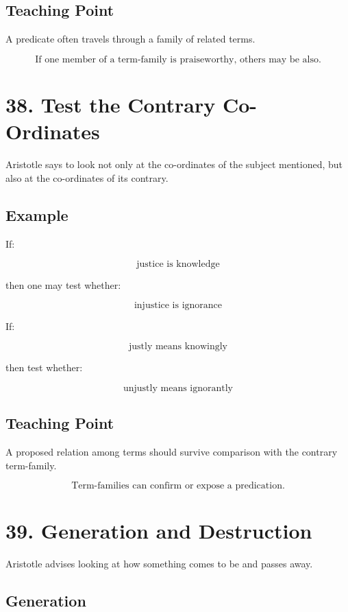 \documentclass[12pt]{article}
\begin{document}
\subsection*{Teaching Point}

A predicate often travels through a family of related terms.

\[
\boxed{
\text{If one member of a term-family is praiseworthy, others may be also.}
}
\]

\section*{38. Test the Contrary Co-Ordinates}

Aristotle says to look not only at the co-ordinates of the subject mentioned,
but also at the co-ordinates of its contrary.

\subsection*{Example}

If:

\[
\text{justice is knowledge}
\]

then one may test whether:

\[
\text{injustice is ignorance}
\]

If:

\[
\text{justly means knowingly}
\]

then test whether:

\[
\text{unjustly means ignorantly}
\]

\subsection*{Teaching Point}

A proposed relation among terms should survive comparison with the contrary
term-family.

\[
\boxed{
\text{Term-families can confirm or expose a predication.}
}
\]

\section*{39. Generation and Destruction}

Aristotle advises looking at how something comes to be and passes away.

\subsection*{Generation}
\end{document}
